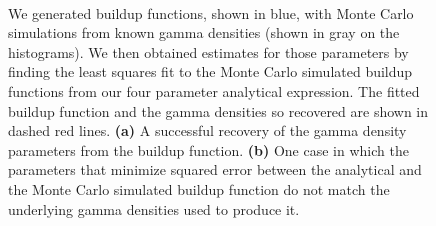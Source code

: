 \documentclass{frontiersSCNS} %
\begin{document}
\begin{figure}
	\centering
	 \\
	\vspace{20pt}
	
	\caption{We generated buildup functions, shown in blue, with Monte Carlo simulations from known gamma densities (shown in gray on the histograms). We then obtained estimates for those parameters by finding the least squares fit to the Monte Carlo simulated buildup functions from our four parameter analytical expression. The fitted buildup function and the gamma densities so recovered are shown in dashed red lines. \textbf{(a)} A successful recovery of the gamma density parameters from the buildup function. \textbf{(b)} One case in which the parameters that minimize squared error between the analytical and the Monte Carlo simulated buildup function do not match the underlying gamma densities used to produce it.}
	\label{fig:reverse_fit_4par}
\end{figure}
\end{document}
